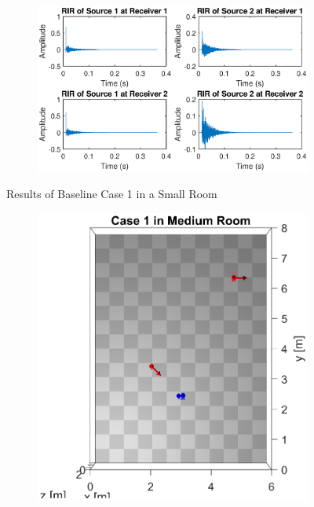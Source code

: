 \documentclass[a4paper,twoside,12pt,hidelinks]{article}
\begin{document}
\begin{appendices}
\begin{figure}[H]
\begin{subfigure}[H]{0.55\textwidth}
\includegraphics[width=\textwidth]{1s_ir}
\end{subfigure}
\caption{Results of Baseline Case 1 in a Small Room}
\end{figure}
\vspace*{-0.5cm}
\begin{figure}[H]
\centering
\begin{subfigure}[H]{0.3\textwidth}
\includegraphics[width=\textwidth]{1m_lo}
\end{subfigure}
\begin{subfigure}[H]{0.55\textwidth}

\end{subfigure}
\end{figure}
\end{appendices}
\end{document}
